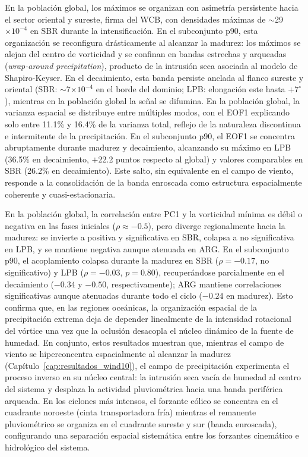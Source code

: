En la población global, los máximos se organizan con asimetría persistente hacia el sector oriental y sureste, firma del WCB, con densidades máximas de $\sim$29$\times10^{-4}$ en SBR durante la intensificación. En el subconjunto p90, esta organización se reconfigura drásticamente al alcanzar la madurez: los máximos se alejan del centro de vorticidad y se confinan en bandas estrechas y arqueadas (\textit{wrap-around precipitation}), producto de la intrusión seca asociada al modelo de Shapiro-Keyser. En el decaimiento, esta banda persiste anclada al flanco sureste y oriental (SBR: $\sim$7$\times10^{-4}$ en el borde del dominio; LPB: elongación este hasta $+7^{\circ}$), mientras en la población global la señal se difumina.
En la población global, la varianza espacial se distribuye entre múltiples modos, con el EOF1 explicando solo entre 11.1\% y 16.4\% de la varianza total, reflejo de la naturaleza discontinua e intermitente de la precipitación. 
En el subconjunto p90, el EOF1 se concentra abruptamente durante madurez y decaimiento, alcanzando su máximo en LPB (36.5\% en decaimiento, $+$22.2 puntos respecto al global) y valores comparables en SBR (26.2\% en decaimiento). 
Este salto, sin equivalente en el campo de viento, responde a la consolidación de la banda enroscada como estructura espacialmente coherente y cuasi-estacionaria.

En la población global, la correlación entre PC1 y la vorticidad mínima es débil o negativa en las fases iniciales
($\rho \approx -0.5$), pero diverge regionalmente hacia la madurez: se invierte a positiva y significativa en SBR,
colapsa a no significativa en LPB, y se mantiene negativa aunque atenuada en ARG.
En el subconjunto p90, el acoplamiento colapsa durante la madurez en SBR ($\rho = -0.17$, no significativo) y LPB ($\rho = -0.03$, $p = 0.80$), recuperándose parcialmente en el decaimiento ($-0.34$ y $-0.50$, respectivamente); ARG mantiene correlaciones significativas aunque atenuadas durante todo el ciclo ($-0.24$ en madurez). 
Esto confirma que, en las regiones oceánicas, la organización espacial de la precipitación extrema deja de depender linealmente de la intensidad rotacional del vórtice una vez que la oclusión desacopla el núcleo dinámico de la fuente de humedad.
En conjunto, estos resultados muestran que, mientras el campo de viento se hiperconcentra espacialmente al alcanzar la madurez (Capítulo~\ref{cap:resultados_wind10}), el campo de precipitación experimenta el proceso inverso en su núcleo central: la intrusión seca vacía de humedad al centro del sistema y desplaza la actividad pluviométrica hacia una banda periférica arqueada. En los ciclones más intensos, el forzante eólico se concentra en el cuadrante noroeste (cinta transportadora fría) mientras el remanente pluviométrico se organiza en el cuadrante sureste y sur (banda enroscada), configurando una separación espacial sistemática entre los forzantes cinemático e hidrológico del sistema.

